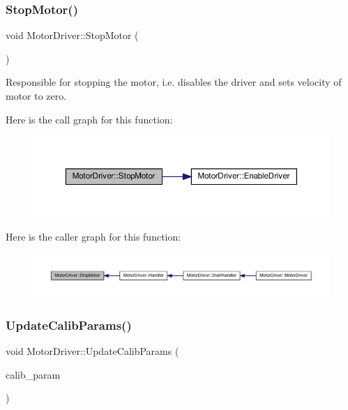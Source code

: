 \subsubsection{\texorpdfstring{Stop\+Motor()}{StopMotor()}}
{\footnotesize\ttfamily void Motor\+Driver\+::\+Stop\+Motor (\begin{DoxyParamCaption}{ }\end{DoxyParamCaption})\hspace{0.3cm}{\ttfamily [private]}}



Responsible for stopping the motor, i.\+e. disables the driver and sets velocity of motor to zero. 

Here is the call graph for this function\+:
\nopagebreak
\begin{figure}[H]
\begin{center}
\leavevmode
\includegraphics[width=350pt]{classMotorDriver_aff8659e64841fb4b97c23b3494cd0575_cgraph}
\end{center}
\end{figure}
Here is the caller graph for this function\+:
\nopagebreak
\begin{figure}[H]
\begin{center}
\leavevmode
\includegraphics[width=350pt]{classMotorDriver_aff8659e64841fb4b97c23b3494cd0575_icgraph}
\end{center}
\end{figure}
\mbox{\label{classMotorDriver_a04e97c6adc4df4d186d6799dfd8165b2}} 
\subsubsection{\texorpdfstring{Update\+Calib\+Params()}{UpdateCalibParams()}}
{\footnotesize\ttfamily void Motor\+Driver\+::\+Update\+Calib\+Params (\begin{DoxyParamCaption}\item[{\hyperlink{structCONFIG__SET_1_1CALIB__PARAMS}{C\+O\+N\+F\+I\+G\+\_\+\+S\+E\+T\+::\+C\+A\+L\+I\+B\+\_\+\+P\+A\+R\+A\+MS}}]{calib\+\_\+param }\end{DoxyParamCaption})}



